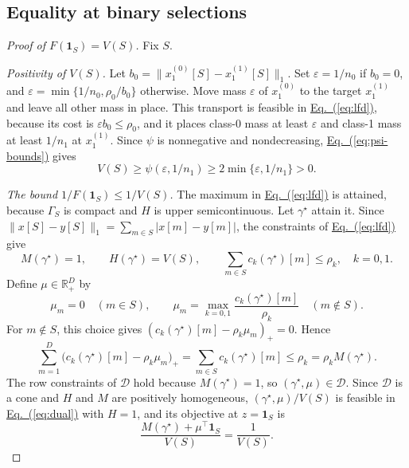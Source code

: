 \documentclass[11pt,a4paper]{article}
\newcommand{\Eqref}[1]{\hyperref[#1]{Eq.~(\ref*{#1})}}
\theoremstyle{plain}
\begin{document}
\subsection{Equality at binary selections}\label{app:dual:binary}
\begin{proof}[Proof of $F(\mathbf1_S)=V(S)$]
Fix $S$.

\emph{Positivity of $V(S)$.}
Let $b_0=\|x_1^{(0)}[S]-x_1^{(1)}[S]\|_1$. Set $\varepsilon=1/n_0$ if
$b_0=0$, and $\varepsilon=\min\{1/n_0,\rho_0/b_0\}$ otherwise. Move mass
$\varepsilon$ of $x_1^{(0)}$ to the target $x_1^{(1)}$ and leave all
other mass in place. This transport is feasible in \Eqref{eq:lfd},
because its cost is $\varepsilon b_0\le\rho_0$, and it places class-0
mass at least $\varepsilon$ and class-1 mass at least $1/n_1$ at
$x_1^{(1)}$. Since $\psi$ is nonnegative and nondecreasing,
\Eqref{eq:psi-bounds} gives
\[
V(S)\ge\psi(\varepsilon,1/n_1)\ge2\min\{\varepsilon,1/n_1\}>0.
\]

\emph{The bound $1/F(\mathbf1_S)\le1/V(S)$.}
The maximum in \Eqref{eq:lfd} is attained, because $\Gamma_S$ is
compact and $H$ is upper semicontinuous. Let $\gamma^\star$ attain it.
Since $\|x[S]-y[S]\|_1=\sum_{m\in S}|x[m]-y[m]|$, the constraints of
\Eqref{eq:lfd} give
\[
M(\gamma^\star)=1,\qquad H(\gamma^\star)=V(S),\qquad
\sum_{m\in S}c_k(\gamma^\star)[m]\le\rho_k,\quad k=0,1.
\]
Define $\mu\in\mathbb R_+^D$ by
\begin{equation}\label{eq:mu-star}
\mu_m=0\quad(m\in S),\qquad
\mu_m=\max_{k=0,1}\frac{c_k(\gamma^\star)[m]}{\rho_k}\quad(m\notin S).
\end{equation}
For $m\notin S$, this choice gives
$(c_k(\gamma^\star)[m]-\rho_k\mu_m)_+=0$. Hence
\[
\sum_{m=1}^D\bigl(c_k(\gamma^\star)[m]-\rho_k\mu_m\bigr)_+
=\sum_{m\in S}c_k(\gamma^\star)[m]\le\rho_k=\rho_kM(\gamma^\star).
\]
The row constraints of $\mathcal D$ hold because $M(\gamma^\star)=1$,
so $(\gamma^\star,\mu)\in\mathcal D$. Since $\mathcal D$ is a cone and
$H$ and $M$ are positively homogeneous, $(\gamma^\star,\mu)/V(S)$ is
feasible in \Eqref{eq:dual} with $H=1$, and its objective at
$z=\mathbf1_S$ is
\[
\frac{M(\gamma^\star)+\mu^\top\mathbf1_S}{V(S)}=\frac1{V(S)}.
\]


\end{proof}
\end{document}
